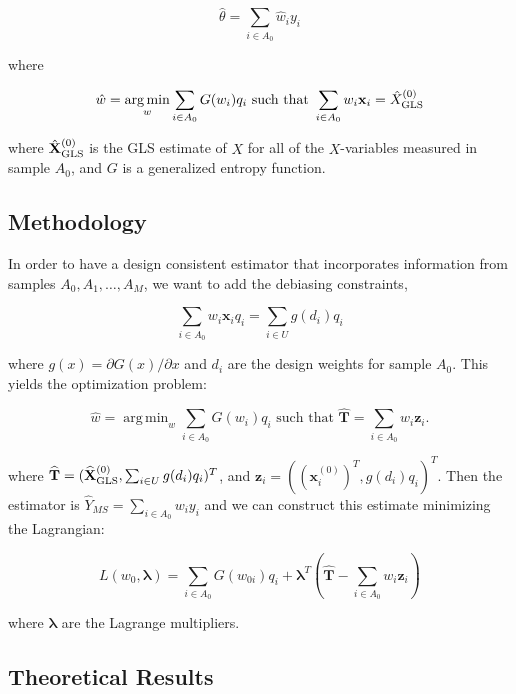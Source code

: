 \documentclass[12pt]{article}
\DeclareMathOperator*{\argmin}{arg\,min}
\renewcommand{\bf}[1]{\mathbf{#1}}
\begin{document}
$$\hat \theta = \sum_{i \in A_0} \hat w_i y_i$$

where 

\begin{equation}\label{eq:mstps}
\hat w = \argmin_w \sum_{i \in A_0} G(w_i)q_i \text{ such that } 
\sum_{i \in A_0} w_i \bf x_i = \hat X_{\rm{GLS}}^{(0)}
\end{equation}

where $\hat{\bf X}_{\rm{GLS}}^{(0)}$ is the GLS estimate of $X$ for all of the
$X$-variables measured in sample $A_0$, and $G$ is a generalized entropy
function. 

\subsection{Methodology}

In order to have a design consistent estimator that incorporates information from
samples $A_0, A_1, \dots, A_M$, we want to add the debiasing constraints, 

\begin{equation}\label{eq:msdebconstr}
\sum_{i \in A_0} w_{i} \bf x_i q_i = \sum_{i \in U} g(d_i) q_i
\end{equation}

where $g(x) = \partial G(x) / \partial x$ and $d_i$ are the design weights for
sample $A_0$. This yields the optimization problem:

\begin{equation}\label{eq:dc3}
  \hat w = \argmin_w \sum_{i \in A_0} G(w_i) q_i \text{ such that }
  \widehat{\bf{T}} = \sum_{i \in A_0} w_i \bf z_i.
\end{equation}

where $\widehat{\bf{T}} = (\widehat{\bf X}_{\rm{GLS}}^{(0)},
\sum_{i \in U} g(d_i) q_i)^T$,
and $\bf z_i = ((\bf x_i^{(0)})^T, g(d_i)q_i)^T$. Then
the estimator is $\hat Y_{MS} = \sum_{i \in A_0} w_{i} y_i$ and we can construct
this estimate minimizing the Lagrangian:

$$
L(w_{0}, \bm \lambda) = \sum_{i \in A_0} G(w_{0i}) q_i + {\bm \lambda}^T
\left(\widehat{\bf{T}} - \sum_{i \in A_0} w_i \bf z_i\right)
$$

where $\bm \lambda$ are the Lagrange multipliers.

\subsection{Theoretical Results}
\end{document}
